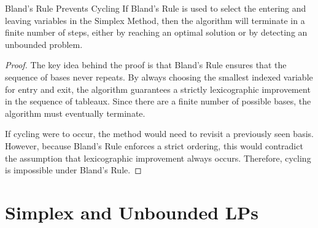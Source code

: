 \begin{theorem}{Bland's Rule Prevents Cycling}{}{}
If Bland's Rule is used to select the entering and leaving variables in the Simplex Method, then the algorithm will terminate in a finite number of steps, either by reaching an optimal solution or by detecting an unbounded problem.
\end{theorem}

\begin{proof}
The key idea behind the proof is that Bland's Rule ensures that the sequence of bases never repeats. By always choosing the smallest indexed variable for entry and exit, the algorithm guarantees a strictly lexicographic improvement in the sequence of tableaux. Since there are a finite number of possible bases, the algorithm must eventually terminate.

If cycling were to occur, the method would need to revisit a previously seen basis. However, because Bland's Rule enforces a strict ordering, this would contradict the assumption that lexicographic improvement always occurs. Therefore, cycling is impossible under Bland's Rule.
\end{proof}


\section{Simplex and Unbounded LPs}

